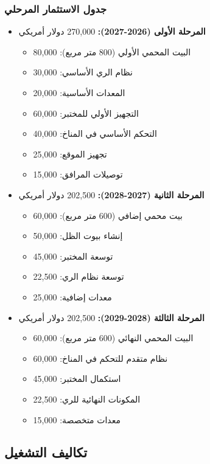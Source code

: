 \subsubsection{جدول الاستثمار المرحلي}
\begin{itemize}
    \item \textbf{المرحلة الأولى (2026-2027):} 270,000 دولار أمريكي
    \begin{itemize}
        \item البيت المحمي الأولي (800 متر مربع): 80,000
        \item نظام الري الأساسي: 30,000
        \item المعدات الأساسية: 20,000
        \item التجهيز الأولي للمختبر: 60,000
        \item التحكم الأساسي في المناخ: 40,000
        \item تجهيز الموقع: 25,000
        \item توصيلات المرافق: 15,000
    \end{itemize}
    
    \item \textbf{المرحلة الثانية (2027-2028):} 202,500 دولار أمريكي
    \begin{itemize}
        \item بيت محمي إضافي (600 متر مربع): 60,000
        \item إنشاء بيوت الظل: 50,000
        \item توسعة المختبر: 45,000
        \item توسعة نظام الري: 22,500
        \item معدات إضافية: 25,000
    \end{itemize}
    
    \item \textbf{المرحلة الثالثة (2028-2029):} 202,500 دولار أمريكي
    \begin{itemize}
        \item البيت المحمي النهائي (600 متر مربع): 60,000
        \item نظام متقدم للتحكم في المناخ: 60,000
        \item استكمال المختبر: 45,000
        \item المكونات النهائية للري: 22,500
        \item معدات متخصصة: 15,000
    \end{itemize}
\end{itemize}

\subsection{تكاليف التشغيل}

